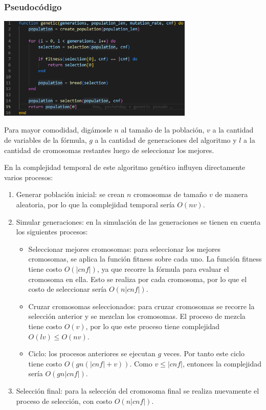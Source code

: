 \documentclass{article}
\begin{document}
        \subsubsection*{Pseudocódigo}
            
            \includegraphics[width = 0.7\textwidth]{resources/code3.png}

            Para mayor comodidad, digámosle $n$ al tamaño de la población, $v$ a la cantidad de variables de 
            la fórmula, $g$ a la cantidad de generaciones del algoritmo y $l$ a la cantidad de cromosomas restantes 
            luego de seleccionar los mejores.
            
            En la complejidad temporal de este algoritmo genético influyen directamente varios procesos:
            \begin{enumerate}
                \item Generar población inicial: se crean $n$ cromosomas de tamaño $v$ de manera 
                aleatoria, por lo que la complejidad temporal sería $O(nv)$.  
                \item Simular generaciones: en la simulación de las generaciones se tienen en cuenta los siguientes
                procesos:
                    \begin{itemize}
                        \item Seleccionar mejores cromosomas: para seleccionar los mejores cromosomas, se aplica la 
                        función fitness sobre cada uno. La función fitness tiene costo $O(|cnf|)$, ya que 
                        recorre la fórmula para evaluar el cromosoma en ella. Esto se realiza por cada cromosoma, 
                        por lo que el costo de seleccionar sería $O(n|cnf|)$.  
                        \item Cruzar cromosomas seleccionados: para cruzar cromosomas se recorre la selección anterior
                        y se mezclan los cromosomas. El proceso de mezcla tiene costo $O(v)$, por lo que este 
                        proceso tiene complejidad $O(lv) \leq O(nv)$. 
                        \item Ciclo: los procesos anteriores se ejecutan $g$ veces. Por tanto 
                        este ciclo tiene costo $O(gn(|cnf|+v))$. Como $v \leq |cnf|$,
                        entonces la complejidad sería $O(gn|cnf|)$.
                    \end{itemize}
                \item Selección final: para la selección del cromosoma final se realiza nuevamente el proceso 
                de selección, con costo $O(n|cnf|)$.
            \end{enumerate}
\end{document}
